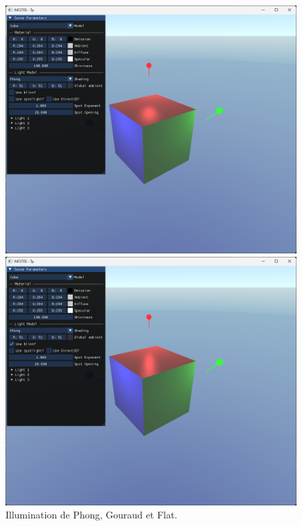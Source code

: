\documentclass{article}[letterpaper, 11pt]
\begin{document}
\begin{figure}[ht]
	\begin{minipage}[r]{.49\linewidth}
		 \begin{flushright}
			\includegraphics[scale = 0.16]{image_7.png}
		 \end{flushright}
	\end{minipage}
	\begin{minipage}[l]{.49\linewidth}
		 \begin{flushleft}
			\includegraphics[scale = 0.16]{image_8.png}
		 \end{flushleft}
	\end{minipage}
		 \caption{ \centering Illumination de Phong, Gouraud et Flat.}
\end{figure}
\end{document}
